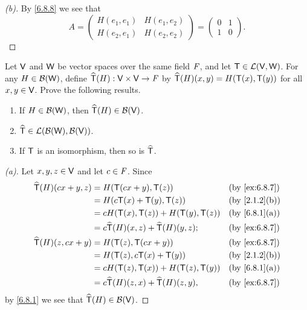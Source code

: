 \begin{proof}[(b)]
  By \cref{6.8.8} we see that
  \[
    A = \begin{pmatrix}
      H(e_1, e_1) & H(e_1, e_2) \\
      H(e_2, e_1) & H(e_2, e_2)
    \end{pmatrix} = \begin{pmatrix}
      0 & 1 \\
      1 & 0
    \end{pmatrix}.
  \]
\end{proof}

\begin{ex}\label{ex:6.8.7}
  Let \(\mathsf{V}\) and \(\mathsf{W}\) be vector spaces over the same field \(\mathit{F}\), and let \(\mathsf{T} \in \mathcal{L}(\mathsf{V}, \mathsf{W})\).
  For any \(H \in \mathcal{B}(\mathsf{W})\), define \(\widehat{\mathsf{T}}(H) : \mathsf{V} \times \mathsf{V} \to \mathit{F}\) by \(\widehat{\mathsf{T}}(H)(x, y) = H(\mathsf{T}(x), \mathsf{T}(y))\) for all \(x, y \in \mathsf{V}\).
  Prove the following results.
  \begin{enumerate}
    \item If \(H \in \mathcal{B}(\mathsf{W})\), then \(\widehat{\mathsf{T}}(H) \in \mathcal{B}(\mathsf{V})\).
    \item \(\widehat{\mathsf{T}} \in \mathcal{L}(\mathcal{B}(\mathsf{W}), \mathcal{B}(\mathsf{V}))\).
    \item If \(\mathsf{T}\) is an isomorphism, then so is \(\widehat{\mathsf{T}}\).
  \end{enumerate}
\end{ex}

\begin{proof}[(a)]
  Let \(x, y, z \in \mathsf{V}\) and let \(c \in \mathit{F}\).
  Since
  \begin{align*}
    \widehat{\T}(H)(cx + y, z) & = H(\T(cx + y), \T(z))                             &  & \by{ex:6.8.7} \\
                               & = H(c \T(x) + \T(y), \T(z))                        &  & \by{2.1.2}[b] \\
                               & = c H(\T(x), \T(z)) + H(\T(y), \T(z))              &  & \by{6.8.1}[a] \\
                               & = c \widehat{\T}(H)(x, z) + \widehat{\T}(H)(y, z); &  & \by{ex:6.8.7} \\
    \widehat{\T}(H)(z, cx + y) & = H(\T(z), \T(cx + y))                             &  & \by{ex:6.8.7} \\
                               & = H(\T(z), c \T(x) + \T(y))                        &  & \by{2.1.2}[b] \\
                               & = c H(\T(z), \T(x)) + H(\T(z), \T(y))              &  & \by{6.8.1}[a] \\
                               & = c \widehat{\T}(H)(z, x) + \widehat{\T}(H)(z, y), &  & \by{ex:6.8.7}
  \end{align*}
  by \cref{6.8.1} we see that \(\widehat{\mathsf{T}}(H) \in \mathcal{B}(\mathsf{V})\).
\end{proof}

